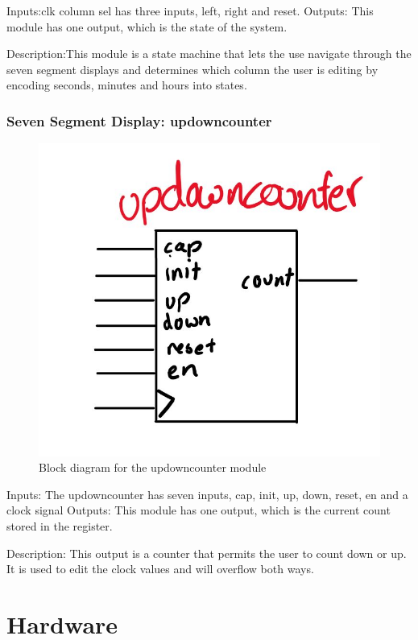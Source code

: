 \documentclass[a4paper]{article}
\begin{document}
Inputs:clk column sel has three inputs, left, right and reset. 
Outputs: This module has one output, which is the state of the system. 

Description:This module is a state machine that lets the use navigate through the seven segment displays and determines which column the user is editing by encoding seconds, minutes and hours into states. 

\subsubsection{Seven Segment Display: updowncounter}
\begin{figure}[H]
    \includegraphics[width=0.8 \linewidth]{images/updowncounter.JPG}
    \caption{Block diagram for the updowncounter module}
    \label{updowncounter}
\end{figure}

Inputs: The updowncounter has seven inputs, cap, init, up, down, reset, en and a clock signal
Outputs: This module has one output, which is the current count stored in the register.

Description: This output is a counter that permits the user to count down or up. It is used to edit the clock values and will overflow both ways.

\section{Hardware}%
\end{document}
